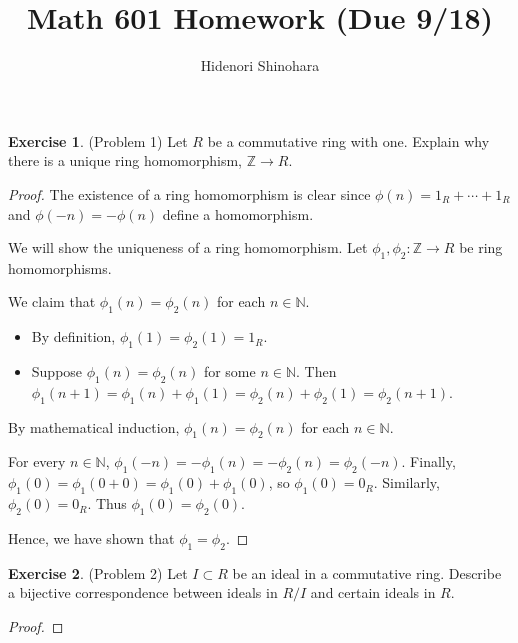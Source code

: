 \documentclass[12pt, psamsfonts]{amsart}
\theoremstyle{definition}
\newtheorem*{exer}{Exercise}
\theoremstyle{remark}
\numberwithin{equation}{section}
\begin{document}
\title{Math 601 Homework (Due 9/18)}
\author{Hidenori Shinohara}
\maketitle

\begin{exer}{(Problem 1)}
  Let $R$ be a commutative ring with one.
  Explain why there is a unique ring homomorphism, $\mathbb{Z} \rightarrow R$.
\end{exer}

\begin{proof}
  The existence of a ring homomorphism is clear since $\phi(n) = 1_R + \cdots + 1_R$ and $\phi(-n) = -\phi(n)$ define a homomorphism.

  We will show the uniqueness of a ring homomorphism.
  Let $\phi_1, \phi_2: \mathbb{Z} \rightarrow R$ be ring homomorphisms.

  We claim that $\phi_1(n) = \phi_2(n)$ for each $n \in \mathbb{N}$.
  \begin{itemize}
    \item
      By definition, $\phi_1(1) = \phi_2(1) = 1_R$.
    \item
      Suppose $\phi_1(n) = \phi_2(n)$ for some $n \in \mathbb{N}$.
      Then $\phi_1(n + 1) = \phi_1(n) + \phi_1(1) = \phi_2(n) + \phi_2(1) = \phi_2(n + 1)$.
  \end{itemize}
  By mathematical induction, $\phi_1(n) = \phi_2(n)$ for each $n \in \mathbb{N}$.

  For every $n \in \mathbb{N}$, $\phi_1(-n) = -\phi_1(n) = -\phi_2(n) = \phi_2(-n)$.
  Finally, $\phi_1(0) = \phi_1(0 + 0) = \phi_1(0) + \phi_1(0)$, so $\phi_1(0) = 0_R$.
  Similarly, $\phi_2(0) = 0_R$.
  Thus $\phi_1(0) = \phi_2(0)$.

  Hence, we have shown that $\phi_1 = \phi_2$.
\end{proof}

\begin{exer}{(Problem 2)}
  Let $I \subset R$ be an ideal in a commutative ring.
  Describe a bijective correspondence between ideals in $R / I$ and certain ideals in $R$.
\end{exer}

\begin{proof}
\end{proof}
\end{document}
